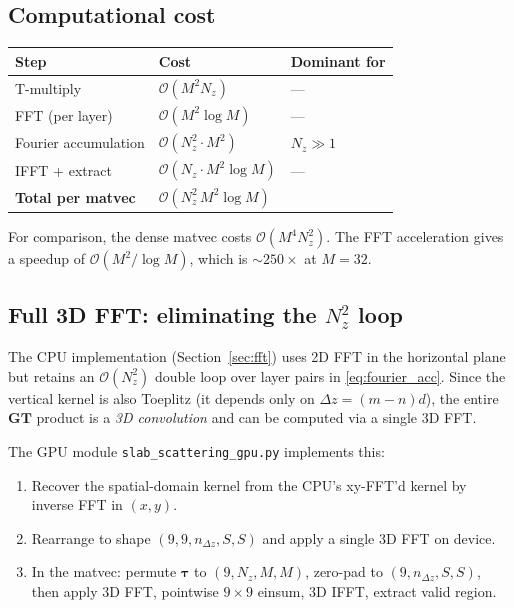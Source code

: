 \documentclass[11pt,a4paper]{article}
\newcommand{\D}{\Delta}
\newcommand{\order}{\mathcal{O}}
\newcommand{\bG}{\bm{G}}
\newcommand{\bT}{\bm{T}}
\begin{document}
\subsection{Computational cost}

\begin{center}
\renewcommand{\arraystretch}{1.3}
\begin{tabular}{lll}
\toprule
\textbf{Step} & \textbf{Cost} & \textbf{Dominant for} \\
\midrule
T-multiply & $\order(M^2 N_z)$ & --- \\
FFT (per layer) & $\order(M^2 \log M)$ & --- \\
Fourier accumulation & $\order(N_z^2 \cdot M^2)$ & $N_z \gg 1$ \\
IFFT + extract & $\order(N_z \cdot M^2 \log M)$ & --- \\
\midrule
\textbf{Total per matvec} & $\order(N_z^2\,M^2 \log M)$ & \\
\bottomrule
\end{tabular}
\end{center}

For comparison, the dense matvec costs $\order(M^4 N_z^2)$.
The FFT acceleration gives a speedup of $\order(M^2 / \log M)$,
which is $\sim\!250\times$ at $M = 32$.

\subsection{Full 3D FFT: eliminating the $N_z^2$ loop}
\label{sec:3dfft}

The CPU implementation (Section~\ref{sec:fft}) uses 2D FFT in the
horizontal plane but retains an $\order(N_z^2)$ double loop over
layer pairs in \eqref{eq:fourier_acc}.  Since the vertical kernel
is also Toeplitz (it depends only on $\D z = (m - n)d$), the
entire $\bG\bT$ product is a \emph{3D convolution} and can be
computed via a single 3D FFT.

The GPU module \texttt{slab\_scattering\_gpu.py} implements this:
\begin{enumerate}[nosep]
  \item Recover the spatial-domain kernel from the CPU's
    xy-FFT'd kernel by inverse FFT in $(x, y)$.
  \item Rearrange to shape $(9, 9, n_{\D z}, S, S)$ and apply a
    single 3D FFT on device.
  \item In the matvec: permute $\bm{\tau}$ to $(9, N_z, M, M)$,
    zero-pad to $(9, n_{\D z}, S, S)$, then apply 3D FFT,
    pointwise $9 \times 9$ einsum, 3D IFFT, extract valid region.
\end{enumerate}
\end{document}
